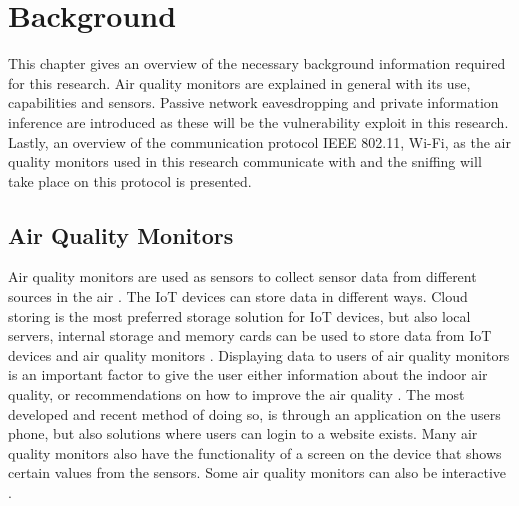 \chapter{Background}
This chapter gives an overview of the necessary background information required for this research. Air quality monitors are explained in general with its use, capabilities and sensors. Passive network eavesdropping and private information inference are introduced as these will be the vulnerability exploit in this research. Lastly, an overview of the communication protocol IEEE 802.11, \gls{Wi-Fi}, as the air quality monitors used in this research communicate with and the sniffing will take place on this protocol is presented.

\section{Air Quality Monitors}
Air quality monitors are used as sensors to collect sensor data from different sources in the air \cite{GeneralAirQualityMonitor}. The \gls{IoT} devices can store data in different ways. Cloud storing is the most preferred storage solution for \gls{IoT} devices, but also local servers, internal storage and memory cards can be used to store data from \gls{IoT} devices and air quality monitors \cite{AQMBigSource}. Displaying data to users of air quality monitors is an important factor to give the user either information about the indoor air quality, or recommendations on how to improve the air quality \cite{AQMBigSource}. The most developed and recent method of doing so, is through an application on the users phone, but also solutions where users can login to a website exists. Many air quality monitors also have the functionality of a screen on the device that shows certain values from the sensors. Some air quality monitors can also be interactive \cite{AQMBigSource}.

